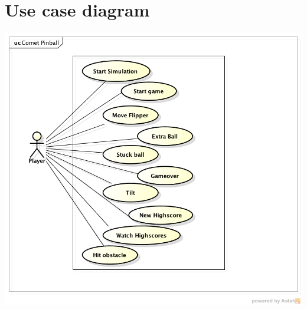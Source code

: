 \documentclass[fontsize=12pt,
               paper=a4,
               twoside=false,
               parskip=half,
               ]{scrartcl}
\begin{document}
\section{Use case diagram}


\includegraphics[width=15cm]{./img/usecase-model.png}
\end{document}

